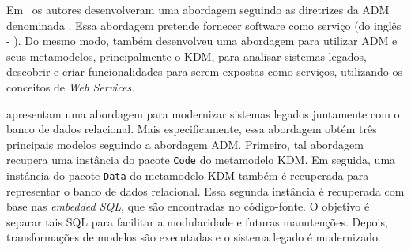 Em~ os autores desenvolveram uma abordagem seguindo as diretrizes da ADM denominada . Essa abordagem pretende fornecer software como serviço (do inglês - ). %
Do mesmo modo,  também desenvolveu uma abordagem para utilizar ADM e seus metamodelos, principalmente o KDM, para analisar sistemas legados, descobrir e criar funcionalidades para serem expostas como serviços, utilizando os conceitos de \textit{Web Services}.


 apresentam uma abordagem para modernizar sistemas legados juntamente com o banco de dados relacional. Mais especificamente, essa abordagem obtém três principais modelos seguindo a abordagem ADM. Primeiro, tal abordagem recupera uma instância do pacote \texttt{Code} do metamodelo KDM. Em seguida, uma instância do pacote \texttt{Data} do metamodelo KDM também é recuperada para representar o banco de dados relacional. Essa segunda instância é recuperada com base nas \textit{embedded SQL}, que são encontradas no código-fonte. O objetivo é separar tais SQL para facilitar a modularidade e futuras manutenções. Depois, transformações de modelos são executadas e o sistema legado é modernizado.


